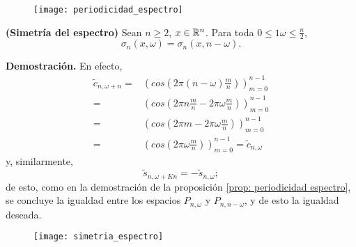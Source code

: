 \begin{figure}[H]
	\centering
	\texttt{[image: periodicidad\_espectro]} 
\end{figure}	


\begin{prop}
\textbf{(Simetría del espectro)}
Sean
$n \geq 2$,
$x \in \mathbb{R}^{n}$. Para toda $0 \leq1 \omega \leq \frac{n}{2}$,
\[
\sigma_{n}(x, \omega) = 
\sigma_{n}(x, n-\omega ). 
\]
\end{prop}
\noindent
\textbf{Demostración.}
En efecto, 
\begin{align*}
\tilde{c}_{n, \omega + n} = & \left( cos \left( 2 \pi
\left( n- \omega \right) \frac{m}{n} \right) \right)_{m=0}^{n-1} \\
= & \left( cos \left( 
2 \pi n \frac{m}{n} - 2 \pi \omega
\frac{m}{n}
\right) \right)_{m=0}^{n-1} \\
= & \left( cos \left( 
2 \pi m - 2 \pi \omega \frac{m}{n} 
\right) \right)_{m=0}^{n-1} \\
= & \left( cos \left( 2 \pi \omega \frac{m}{n} \right) \right)_{m=0}^{n-1}
= \tilde{c}_{n, \omega}
\end{align*}
y, similarmente,
\[
\tilde{s}_{n, \omega + Kn} = -\tilde{s}_{n, \omega};
\]
de esto, como en la demostración de la proposición
\ref{prop: periodicidad espectro}, se concluye la igualdad
entre los espacios $P_{n, \omega}$ y $P_{n, n-\omega}$, y de esto
la igualdad deseada.
\QEDB
\vspace{0.2cm}

\begin{figure}[H]
	\centering
	\texttt{[image: simetria\_espectro]} 
\end{figure}	
 

